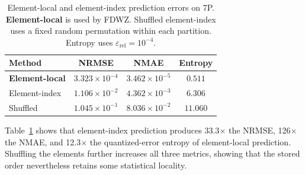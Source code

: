 \begin{table}[htb]
    \centering
    \caption{Element-local and element-index prediction errors on 7P. \textbf{Element-local} is used by FDWZ. Shuffled element-index uses a fixed random permutation within each partition. Entropy uses $\varepsilon_{\mathrm{rel}}=10^{-4}$.}
    \label{tab:element-index-prediction}
    \footnotesize
    \setlength{\tabcolsep}{2.4pt}
    \begin{tabular*}{\columnwidth}{@{\extracolsep{\fill}}lccc@{}}
        \toprule
        Method & NRMSE & NMAE & Entropy \\
        \midrule
        \textbf{Element-local} & $3.323\times10^{-4}$ & $3.462\times10^{-5}$ & $0.511$ \\
        Element-index & $1.106\times10^{-2}$ & $4.362\times10^{-3}$ & $6.306$ \\
        Shuffled & $1.045\times10^{-1}$ & $8.036\times10^{-2}$ & $11.060$ \\
        \bottomrule
    \end{tabular*}
\end{table}

Table~\ref{tab:element-index-prediction} shows that element-index prediction produces 33.3$\times$ the NRMSE, 126$\times$ the NMAE, and 12.3$\times$ the quantized-error entropy of element-local prediction. Shuffling the elements further increases all three metrics, showing that the stored order nevertheless retains some statistical locality.
